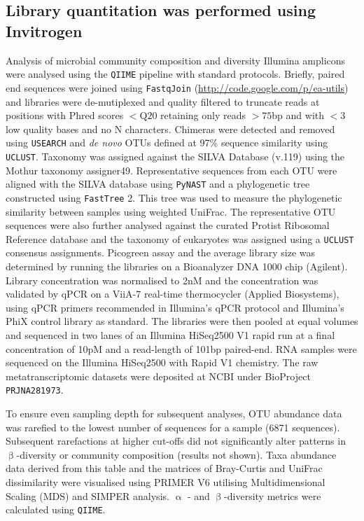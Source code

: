 \subsection{Library quantitation was performed using Invitrogen}

Analysis of microbial community composition and diversity
Illumina amplicons were analysed using the {\tt QIIME} pipeline \cite{caporaso_qiime_2010} with standard protocols. Briefly, paired end sequences were joined using {\tt FastqJoin} (\url{http://code.google.com/p/ea-utils}) and libraries were de-mutiplexed and quality filtered to truncate reads at positions with Phred scores $<\textrm{Q}20$ retaining only reads $>75$bp and with $<3$ low quality bases and no N characters. Chimeras were detected and removed using {\tt USEARCH} \cite{edgar_search_2010} and {\em de novo} OTUs defined at 97\% sequence similarity using {\tt UCLUST}. \cite{edgar_search_2010} Taxonomy was assigned against the SILVA Database (v.119) \cite{quast_silva_2013} using the Mothur taxonomy assigner49. Representative sequences from each OTU were aligned with the SILVA database using {\tt PyNAST} \cite{massana_vertical_1997} and a phylogenetic tree constructed using {\tt FastTree} 2. \cite{price_fasttree_2010} This tree was used to measure the phylogenetic similarity between samples using weighted UniFrac. \cite{lozupone_unifrac:_2005, lozupone_unifrac:_2011} The representative OTU sequences were also further analysed against the curated Protist Ribosomal Reference database \cite{guillou_protist_2013} and the taxonomy of eukaryotes was assigned using a {\tt UCLUST} \cite{edgar_search_2010} consensus assignments. Picogreen assay and the average library size was determined by running the libraries on a Bioanalyzer DNA 1000 chip (Agilent). Library concentration was normalised to 2nM and the concentration was validated by qPCR on a ViiA-7 real-time thermocycler (Applied Biosystems), using qPCR primers recommended in Illumina's qPCR protocol and Illumina's PhiX control library as standard. The libraries were then pooled at equal volumes and sequenced in two lanes of an Illumina HiSeq2500 V1 rapid run at a final concentration of 10pM and a read-length of 101bp paired-end. RNA samples were sequenced on the Illumina HiSeq2500 with Rapid V1 chemistry. The raw metatranscriptomic datasets were deposited at NCBI under BioProject {\tt PRJNA281973}.

To ensure even sampling depth for subsequent analyses, OTU abundance data was rarefied to the lowest number of sequences for a sample (6871 sequences). Subsequent rarefactions at higher cut-offs did not significantly alter patterns in $\upbeta$-diversity or community composition (results not shown). Taxa abundance data derived from this table and the matrices of Bray-Curtis and UniFrac dissimilarity were visualised using PRIMER V6 \cite{clarke2006primer} utilising Multidimensional Scaling (MDS) and SIMPER analysis. \cite{clarke_nonparametric_1993} $\upalpha$ - and $\upbeta$-diversity metrics were calculated using {\tt QIIME}.

